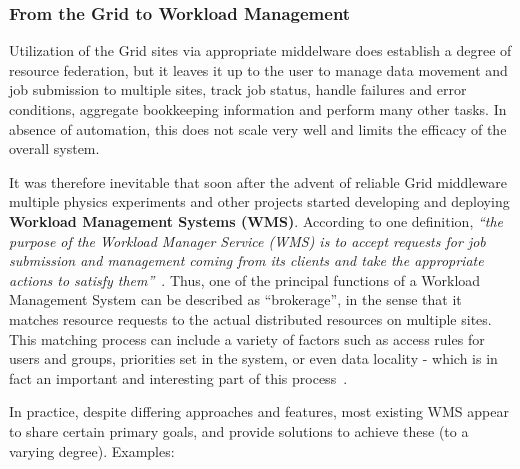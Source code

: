  


%

\subsubsection{From the Grid to Workload Management}
\label{from_grid_to_workload}
Utilization of the Grid sites via appropriate middelware does establish a degree of resource federation, but it leaves it up to the user to manage data movement and job submission to multiple sites,
track job status, handle failures and error conditions, aggregate bookkeeping information and perform many other tasks. In absence of automation, this does not scale very well and limits the efficacy
of the overall system.

It was therefore inevitable that soon after the advent of reliable Grid middleware multiple physics experiments and other projects started developing and deploying \textbf{Workload Management Systems (WMS)}.
 According to one definition,
\textit{``the purpose of the Workload Manager Service (WMS) is to accept requests for job submission and management coming from its clients and take the appropriate actions to satisfy them''}~\cite{egee_user_guide}.
Thus, one of the principal functions of a Workload Management System can be described as ``brokerage'', in the sense that it matches resource requests to the actual distributed resources
on multiple sites. This matching process can include a variety of factors such as access rules for users and groups, priorities set in the system, or even data locality - which is in fact an important and interesting part of this process~\cite{panda_chep10}.

In practice, despite differing approaches and features, most existing WMS appear to share certain primary goals, and provide solutions to achieve these (to a varying degree). Examples:

